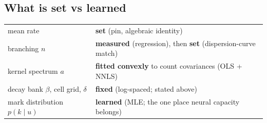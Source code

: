 \documentclass[11pt]{article}
\begin{document}
\subsection{What is set vs learned}
\begin{center}\small
\begin{tabular}{ll}
\toprule
mean rate & \textbf{set} (pin, algebraic identity)\\
branching $n$ & \textbf{measured} (regression), then \textbf{set} (dispersion-curve match)\\
kernel spectrum $a$ & \textbf{fitted convexly} to count covariances (OLS + NNLS)\\
decay bank $\beta$, cell grid, $\delta$ & \textbf{fixed} (log-spaced; stated above)\\
mark distribution $p(k\mid u)$ & \textbf{learned} (MLE; the one place neural capacity belongs)\\
\bottomrule
\end{tabular}
\end{center}
\end{document}
